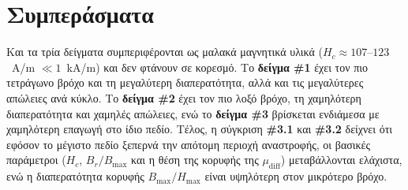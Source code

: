 \documentclass[11pt,a4paper]{article}
\newcommand{\diff}{\mathrm{diff}}
\begin{document}
\section{Συμπεράσματα}
Και τα τρία δείγματα συμπεριφέρονται ως μαλακά μαγνητικά υλικά ($H_c \approx 107$--$123$~\textlatin{A/m} $\ll 1$~\textlatin{kA/m}) και δεν φτάνουν σε κορεσμό. Το \textbf{δείγμα \textlatin{\#}1} έχει τον πιο τετράγωνο βρόχο και τη μεγαλύτερη διαπερατότητα, αλλά και τις μεγαλύτερες απώλειες ανά κύκλο. Το \textbf{δείγμα \textlatin{\#}2} έχει τον πιο λοξό βρόχο, τη χαμηλότερη διαπερατότητα και χαμηλές απώλειες, ενώ το \textbf{δείγμα \textlatin{\#}3} βρίσκεται ενδιάμεσα με χαμηλότερη επαγωγή στο ίδιο πεδίο. Τέλος, η σύγκριση \textbf{\textlatin{\#}3.1} και \textbf{\textlatin{\#}3.2} δείχνει ότι εφόσον το μέγιστο πεδίο ξεπερνά την απότομη περιοχή αναστροφής, οι βασικές παράμετροι ($H_c$, $B_r/B_{\max}$ και η θέση της κορυφής της $\mu_\diff$) μεταβάλλονται ελάχιστα, ενώ η διαπερατότητα κορυφής $B_{\max}/H_{\max}$ είναι υψηλότερη στον μικρότερο βρόχο.
\end{document}
